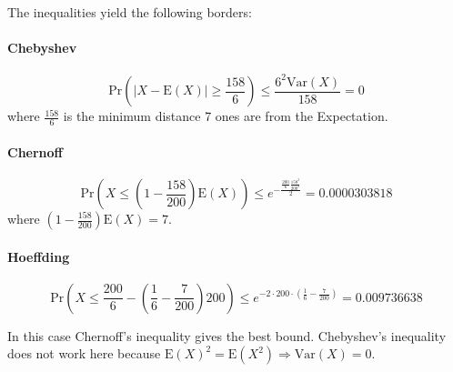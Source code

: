 The inequalities yield the following borders:
\paragraph{Chebyshev}
\[\text{Pr}(|X-\text{E}(X)|\ge\frac{158}{6})\le\frac{6^2 \text{Var}(X)}{158} = 0 \]
where $\frac{158}{6}$ is the minimum distance 7 ones are from the Expectation.

\paragraph{Chernoff}
\[\text{Pr}(X\le \left(1-\frac{158}{200}\right)\text{E}(X) ) \le e^{-\frac{\frac{200}{6}\frac{158^2}{200^2}}{2}} = 0.0000303818 \]
where $\left(1-\frac{158}{200}\right)\text{E}(X) = 7$.

\paragraph{Hoeffding}
\[ \text{Pr}(X\le \frac{200}{6}-\left(\frac{1}{6}-\frac{7}{200}\right)200)\le e^{-2\cdot200\cdot\left(\frac{1}{6}-\frac{7}{200}\right)} = 0.009736638 \]

In this case Chernoff's inequality gives the best bound.
Chebyshev's inequality does not work here because $\text{E}(X)^2 = \text{E}(X^2) \Rightarrow\text{Var}(X)=0$.